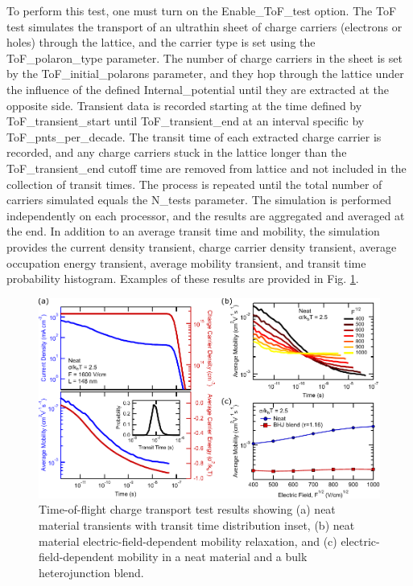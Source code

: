 \documentclass[%
 reprint,onecolumn,notitlepage,
superscriptaddress,longbibliography,
 amsmath,amssymb,
 aps,rmp,floatfix,
]{revtex4-1}
\begin{document}
To perform this test, one must turn on the Enable\_ToF\_test option.
The ToF test simulates the transport of an ultrathin sheet of charge carriers (electrons or holes) through the lattice, and the carrier type is set using the ToF\_polaron\_type parameter.
The number of charge carriers in the sheet is set by the ToF\_initial\_polarons parameter, and they hop through the lattice under the influence of the defined Internal\_potential until they are extracted at the opposite side.
Transient data is recorded starting at the time defined by ToF\_transient\_start until ToF\_transient\_end at an interval specific by ToF\_pnts\_per\_decade.
The transit time of each extracted charge carrier is recorded, and any charge carriers stuck in the lattice longer than the ToF\_transient\_end cutoff time are removed from lattice and not included in the collection of transit times.
The process is repeated until the total number of carriers simulated equals the N\_tests parameter.
The simulation is performed independently on each processor, and the results are aggregated and averaged at the end.
In addition to an average transit time and mobility, the simulation provides the current density transient, charge carrier density transient, average occupation energy transient, average mobility transient, and transit time probability histogram.
Examples of these results are provided in Fig. \ref{fig:tof_example}.

\begin{figure}[h] %
    \centering
    \includegraphics{ToF_example_data.pdf}
    \caption{Time-of-flight charge transport test results showing (a) neat material transients with transit time distribution inset, (b) neat material electric-field-dependent mobility relaxation, and (c) electric-field-dependent mobility in a neat material and a bulk heterojunction blend.}
    \label{fig:tof_example}
\end{figure}
\end{document}
